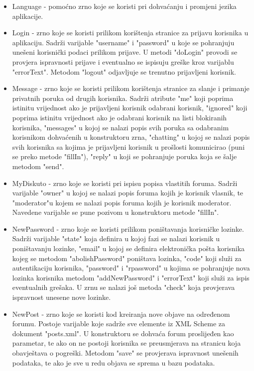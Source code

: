 \documentclass{foi}
\begin{document}
\begin{itemize}
\begin{itemize}
	\item Language - pomoćno zrno koje se koristi pri dohvaćanju i promjeni jezika aplikacije.
	\item Login - zrno koje se koristi prilikom korištenja stranice za prijavu korisnika u aplikaciju. Sadrži varijable "username" i "password" u koje se pohranjuju unešeni korisnički podaci prilikom prijave. U metodi "doLogin" provodi se provjera ispravnosti prijave i eventualno se ispisuju greške kroz varijablu "errorText". Metodom "logout" odjavljuje se trenutno prijavljeni korisnik.
	\item Message - zrno koje se koristi prilikom korištenja stranice za slanje i primanje privatnih poruka od drugih korisnika. Sadrži atribute "me" koji poprima istinitu vrijednost ako je prijavljeni korisnik odabrani korisnik, "ignored" koji poprima istinitu vrijednost ako je odabrani korisnik na listi blokiranih korisnika, "messages" u kojoj se nalazi popis svih poruka sa odabranim korisnikom dohvaćenih u konstruktoru zrna, "chatting" u kojoj se nalazi popis svih korisnika sa kojima je prijavljeni korisnik u prošlosti komunicirao (puni se preko metode "fillIn"), "reply" u koji se pohranjuje poruka koja se šalje metodom "send".
	\item MyDiskuto - zrno koje se koristi pri ispisu popisa vlastitih foruma. Sadrži varijable "owner" u kojoj se nalazi popis foruma kojih je korisnik vlasnik, te "moderator"u kojem se nalazi popis foruma kojih je korisnik moderator. Navedene varijable se pune pozivom u konstruktoru metode "fillIn".
	\item NewPassword - zrno koje se koristi prilikom poništavanja korisničke lozinke. Sadrži varijable "state" koja definira u kojoj fazi se nalazi korisnik u poništavanju lozinke, "email" u kojoj se definira elektronička pošta korisnika kojeg se metodom "abolishPassword" poništava lozinka, "code" koji služi za autentikaciju korisnika, "password" i "rpassword" u kojima se pohranjuje nova lozinka korisnika metodom "addNewPassword" i "errorText" koji služi za ispis eventualnih grešaka. U zrnu se nalazi još metoda "check" koja provjerava ispravnost unesene nove lozinke.
	\item NewPost - zrno koje se koristi kod kreiranja nove objave na određenom forumu. Postoje varijable koje sadrže sve elemente iz XML Scheme za dokument "posts.xml". U konstruktoru se dohvaća forum proslijeđen kao parametar, te ako on ne postoji korisnika se preusmjerava na stranicu koja obavještava o pogreški. Metodom "save" se provjerava ispravnost unešenih podataka, te ako je sve u redu objava se sprema u bazu podataka.

\end{itemize}
\end{itemize}
\end{document}
